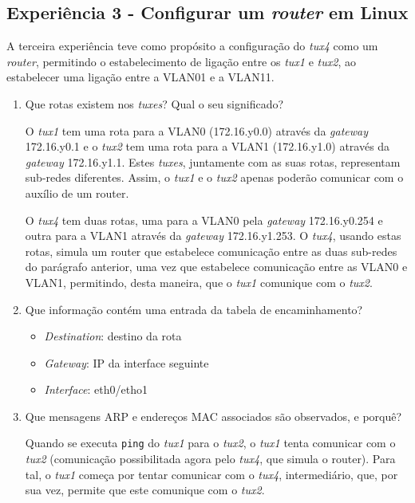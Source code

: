 \documentclass{article}
\begin{document}
\subsection{Experiência 3 - Configurar um \textit{router} em Linux}
A terceira experiência teve como propósito a configuração do \textit{tux4} como um \textit{router}, permitindo o estabelecimento de ligação entre os \textit{tux1} e \textit{tux2}, ao estabelecer uma ligação entre a VLAN01 e a VLAN11.
\begin{enumerate}
\item Que rotas existem nos \textit{tuxes}? Qual o seu significado?

O \textit{tux1} tem uma rota para a VLAN0 (172.16.y0.0) através da \textit{gateway} 172.16.y0.1 e o \textit{tux2} tem uma rota para a VLAN1 (172.16.y1.0) através da \textit{gateway} 172.16.y1.1. Estes \textit{tuxes}, juntamente com as suas rotas, representam sub-redes diferentes. Assim, o \textit{tux1} e o \textit{tux2} apenas poderão comunicar com o auxílio de um router.

O \textit{tux4} tem duas rotas, uma para a VLAN0 pela \textit{gateway} 172.16.y0.254 e outra para a VLAN1 através da \textit{gateway} 172.16.y1.253. O \textit{tux4}, usando estas rotas, simula um router que estabelece comunicação entre as duas sub-redes do parágrafo anterior, uma vez que estabelece comunicação entre as VLAN0 e VLAN1, permitindo, desta maneira, que o \textit{tux1} comunique com o \textit{tux2}.


\item Que informação contém uma entrada da tabela de encaminhamento?

\begin{itemize}
    \item \textit{Destination}: destino da rota
    \item \textit{Gateway}: IP da interface seguinte
    \item \textit{Interface}: eth0/etho1
\end{itemize}


\item Que mensagens ARP e endereços MAC associados são observados, e porquê?

Quando se executa \texttt{ping} do \textit{tux1} para o \textit{tux2}, o \textit{tux1} tenta comunicar com o \textit{tux2} (comunicação possibilitada agora pelo \textit{tux4}, que simula o router). Para tal, o \textit{tux1} começa por tentar comunicar com o \textit{tux4}, intermediário, que, por sua vez, permite que este comunique com o \textit{tux2}.


\end{enumerate}
\end{document}
